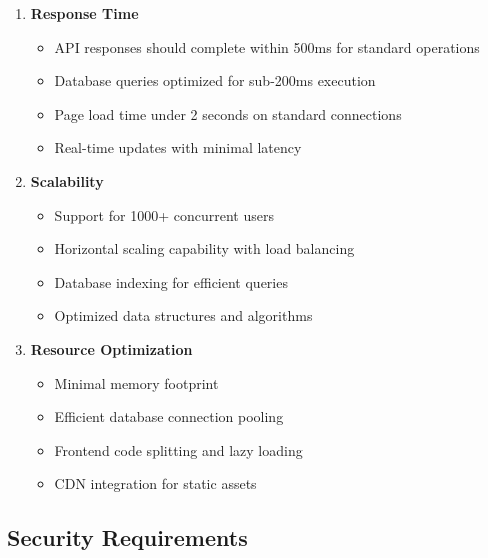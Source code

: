 \begin{enumerate}[leftmargin=*]
    \item \textbf{Response Time}
    \begin{itemize}
        \item API responses should complete within 500ms for standard operations
        \item Database queries optimized for sub-200ms execution
        \item Page load time under 2 seconds on standard connections
        \item Real-time updates with minimal latency
    \end{itemize}
    
    \item \textbf{Scalability}
    \begin{itemize}
        \item Support for 1000+ concurrent users
        \item Horizontal scaling capability with load balancing
        \item Database indexing for efficient queries
        \item Optimized data structures and algorithms
    \end{itemize}
    
    \item \textbf{Resource Optimization}
    \begin{itemize}
        \item Minimal memory footprint
        \item Efficient database connection pooling
        \item Frontend code splitting and lazy loading
        \item CDN integration for static assets
    \end{itemize}
\end{enumerate}

\subsection{Security Requirements}

